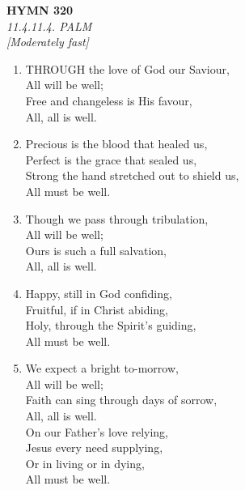 \documentclass[11pt,a4paper]{article}
\begin{document}
\newpage
\begin{center}
    {\Large \textbf{HYMN 320}}
    \\
    \textit{11.4.11.4. PALM}
    \\
    \textit{\small [Moderately fast]}
\end{center}
\vspace{1em}

\begin{enumerate}
    \item THROUGH the love of God our Saviour, \\
        All will be well; \\
        Free and changeless is His favour, \\
        All, all is well.

    \item Precious is the blood that healed us, \\
        Perfect is the grace that sealed us, \\
        Strong the hand stretched out to shield us, \\
        All must be well.

    \item Though we pass through tribulation, \\
        All will be well; \\
        Ours is such a full salvation, \\
        All, all is well.

    \item Happy, still in God confiding, \\
        Fruitful, if in Christ abiding, \\
        Holy, through the Spirit's guiding, \\
        All must be well.

    \item We expect a bright to-morrow, \\
        All will be well; \\
        Faith can sing through days of sorrow, \\
        All, all is well. \\
        On our Father's love relying, \\
        Jesus every need supplying, \\
        Or in living or in dying, \\
        All must be well.

\end{enumerate}
\end{document}
